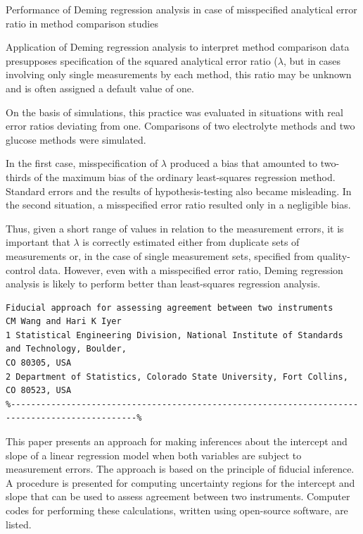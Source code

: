 \newpage
Performance of Deming regression analysis in case of misspecified analytical error ratio in method comparison studies

Application of Deming regression analysis to interpret method comparison data presupposes specification of the 
squared analytical error ratio ($\lambda$, but in cases involving only single measurements by each method, this 
ratio may be unknown and is often assigned a default value of one. 

On the basis of simulations, this practice was evaluated in situations with real error ratios deviating from one. 
Comparisons of two electrolyte methods and two glucose methods were simulated. 

In the first case, misspecification of $\lambda$ produced a bias that amounted to two-thirds of the maximum bias of the 
ordinary least-squares regression method. Standard errors and the results of hypothesis-testing also became misleading. 
In the second situation, a misspecified error ratio resulted only in a negligible bias. 

Thus, given a short range of values in relation to the measurement errors, it is important that $\lambda$ is correctly 
estimated either from duplicate sets of measurements or, in the case of single measurement sets, specified from 
quality-control data. However, even with a misspecified error ratio, Deming regression analysis is likely to perform 
better than least-squares regression analysis.

\newpage
\begin{verbatim}
Fiducial approach for assessing agreement between two instruments
CM Wang and Hari K Iyer
1 Statistical Engineering Division, National Institute of Standards and Technology, Boulder,
CO 80305, USA
2 Department of Statistics, Colorado State University, Fort Collins, CO 80523, USA
%-----------------------------------------------------------------------------------------------%
\end{verbatim}
This paper presents an approach for making inferences about the intercept and slope of a linear
regression model when both variables are subject to measurement errors. The approach is
based on the principle of fiducial inference. A procedure is presented for computing
uncertainty regions for the intercept and slope that can be used to assess agreement between
two instruments. Computer codes for performing these calculations, written using open-source
software, are listed.

